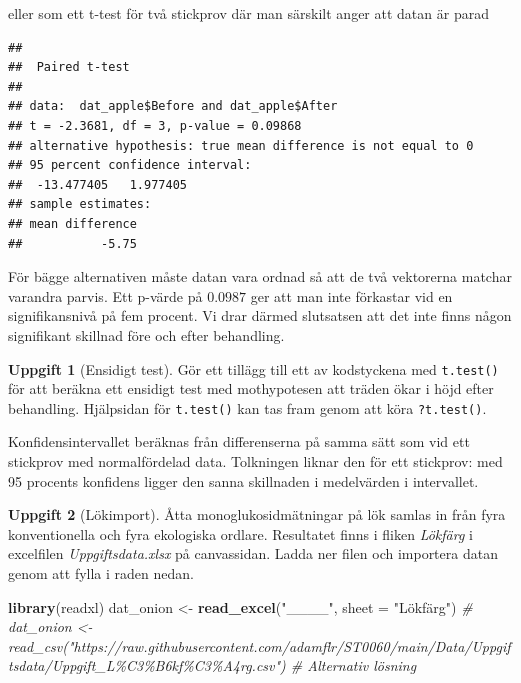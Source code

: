 \documentclass[
]{book}
\newenvironment{Shaded}{\begin{snugshade}}{\end{snugshade}}
\newcommand{\AttributeTok}[1]{\textcolor[rgb]{0.13,0.29,0.53}{#1}}
\newcommand{\CommentTok}[1]{\textcolor[rgb]{0.56,0.35,0.01}{\textit{#1}}}
\newcommand{\FunctionTok}[1]{\textcolor[rgb]{0.13,0.29,0.53}{\textbf{#1}}}
\newcommand{\NormalTok}[1]{#1}
\newcommand{\OtherTok}[1]{\textcolor[rgb]{0.56,0.35,0.01}{#1}}
\newcommand{\SpecialCharTok}[1]{\textcolor[rgb]{0.81,0.36,0.00}{\textbf{#1}}}
\newcommand{\StringTok}[1]{\textcolor[rgb]{0.31,0.60,0.02}{#1}}
\theoremstyle{definition}
\theoremstyle{definition}
\theoremstyle{definition}
\newtheorem{exercise}{Uppgift}[chapter]
\theoremstyle{definition}
\theoremstyle{remark}
\begin{document}
eller som ett t-test för två stickprov där man särskilt anger att datan är parad

\begin{Shaded}
\end{Shaded}

\begin{verbatim}
## 
##  Paired t-test
## 
## data:  dat_apple$Before and dat_apple$After
## t = -2.3681, df = 3, p-value = 0.09868
## alternative hypothesis: true mean difference is not equal to 0
## 95 percent confidence interval:
##  -13.477405   1.977405
## sample estimates:
## mean difference 
##           -5.75
\end{verbatim}

För bägge alternativen måste datan vara ordnad så att de två vektorerna matchar varandra parvis. Ett p-värde på \(0.0987\) ger att man inte förkastar vid en signifikansnivå på fem procent. Vi drar därmed slutsatsen att det inte finns någon signifikant skillnad före och efter behandling.

\begin{exercise}[Ensidigt test]
Gör ett tillägg till ett av kodstyckena med \texttt{t.test()} för att beräkna ett ensidigt test med mothypotesen att träden ökar i höjd efter behandling. Hjälpsidan för \texttt{t.test()} kan tas fram genom att köra \texttt{?t.test()}.
\end{exercise}

Konfidensintervallet beräknas från differenserna på samma sätt som vid ett stickprov med normalfördelad data. Tolkningen liknar den för ett stickprov: med 95 procents konfidens ligger den sanna skillnaden i medelvärden i intervallet.

\begin{exercise}[Lökimport]

Åtta monoglukosidmätningar på lök samlas in från fyra konventionella och fyra ekologiska ordlare. Resultatet finns i fliken \emph{Lökfärg} i excelfilen \emph{Uppgiftsdata.xlsx} på canvassidan. Ladda ner filen och importera datan genom att fylla i raden nedan.

\begin{Shaded}
\begin{Highlighting}[]
\FunctionTok{library}\NormalTok{(readxl)}
\NormalTok{dat\_onion }\OtherTok{\textless{}{-}} \FunctionTok{read\_excel}\NormalTok{(}\StringTok{"\_\_\_\_"}\NormalTok{, }\AttributeTok{sheet =} \StringTok{"Lökfärg"}\NormalTok{)}
\CommentTok{\# dat\_onion \textless{}{-} read\_csv("https://raw.githubusercontent.com/adamflr/ST0060/main/Data/Uppgiftsdata/Uppgift\_L\%C3\%B6kf\%C3\%A4rg.csv") \# Alternativ lösning}
\end{Highlighting}
\end{Shaded}

\end{exercise}
\end{document}
